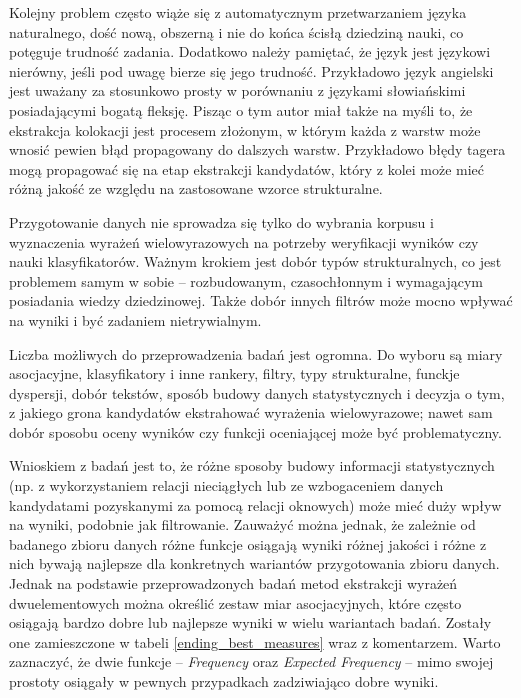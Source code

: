 \documentclass[11pt,a4paper]{llncs}
\begin{document}
\par
Kolejny problem często wiąże się z automatycznym przetwarzaniem języka naturalnego, dość nową, obszerną i nie do końca ścisłą dziedziną nauki, co potęguje trudność zadania.
Dodatkowo należy pamiętać, że język jest językowi nierówny, jeśli pod uwagę bierze się jego trudność.
Przykładowo język angielski jest uważany za stosunkowo prosty w porównaniu z językami słowiańskimi posiadającymi bogatą fleksję.
Pisząc o tym autor miał także na myśli to, że ekstrakcja kolokacji jest procesem złożonym, w którym każda z warstw może wnosić pewien błąd propagowany do dalszych warstw.
Przykładowo błędy tagera mogą propagować się na etap ekstrakcji kandydatów, który z kolei może mieć różną jakość ze względu na zastosowane wzorce strukturalne.

\par
Przygotowanie danych nie sprowadza się tylko do wybrania korpusu i wyznaczenia wyrażeń wielowyrazowych na potrzeby weryfikacji wyników czy nauki klasyfikatorów.
Ważnym krokiem jest dobór typów strukturalnych, co jest problemem samym w sobie -- rozbudowanym, czasochłonnym i wymagającym posiadania wiedzy dziedzinowej.
Także dobór innych filtrów może mocno wpływać na wyniki i być zadaniem nietrywialnym.

\par
Liczba możliwych do przeprowadzenia badań jest ogromna.
Do wyboru są miary asocjacyjne, klasyfikatory i inne rankery, filtry, typy strukturalne, funckje dyspersji, dobór tekstów, sposób budowy danych statystycznych i decyzja o tym, z jakiego grona kandydatów ekstrahować wyrażenia wielowyrazowe; nawet sam dobór sposobu oceny wyników czy funkcji oceniającej może być problematyczny.

\par
Wnioskiem z badań jest to, że różne sposoby budowy informacji statystycznych (np. z wykorzystaniem relacji nieciągłych lub ze wzbogaceniem danych kandydatami pozyskanymi za pomocą relacji oknowych) może mieć duży wpływ na wyniki, podobnie jak filtrowanie.
Zauważyć można jednak, że zależnie od badanego zbioru danych różne funkcje osiągają wyniki różnej jakości i różne z nich bywają najlepsze dla konkretnych wariantów przygotowania zbioru danych.
Jednak na podstawie przeprowadzonych badań metod ekstrakcji wyrażeń dwuelementowych można określić zestaw miar asocjacyjnych, które często osiągają bardzo dobre lub najlepsze wyniki w wielu wariantach badań.
Zostały one zamieszczone w tabeli \ref{ending_best_measures} wraz z komentarzem.
Warto zaznaczyć, że dwie funkcje -- \emph{Frequency} oraz \emph{Expected Frequency} -- mimo swojej prostoty osiągały w pewnych przypadkach zadziwiająco dobre wyniki.
\end{document}
